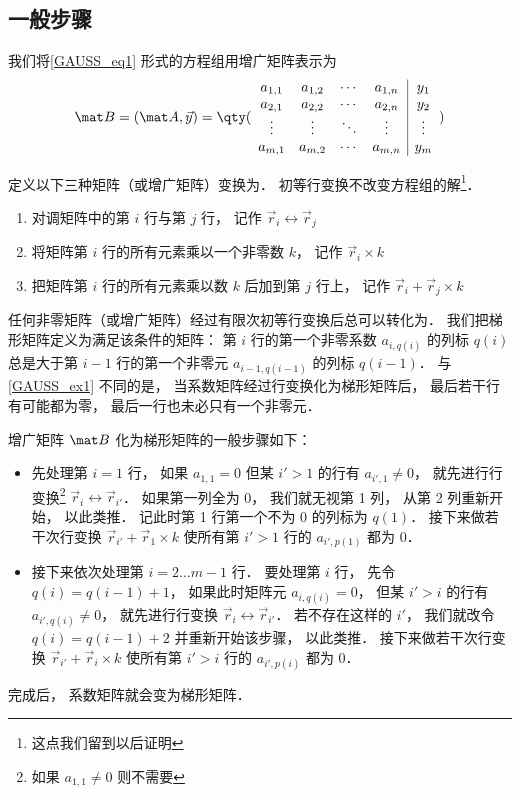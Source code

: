 \subsection{一般步骤}

我们将\autoref{GAUSS_eq1} 形式的方程组用增广矩阵表示为
\begin{equation}
\mat B=(\mat A ,\vec y)={
	\qty( \begin{array}{cccc|c}
	a_{1,1} &a_{1,2} &\cdots &a_{1,n} &y_1 \\
	a_{2,1} &a_{2,2} &\cdots &a_{2,n} &y_2 \\
	\vdots  &\vdots  &\ddots &\vdots  &\vdots \\
	a_{m,1} &a_{m,2} &\cdots &a_{m,n} &y_m \\
	\end{array} 
	)}
\end{equation}

定义以下三种矩阵（或增广矩阵）变换为． 初等行变换不改变方程组的解\footnote{这点我们留到以后证明}．%
\begin{enumerate}
\item 对调矩阵中的第 $i$ 行与第 $j$ 行， 记作 $\vec r_i \leftrightarrow \vec r_j$

\item 将矩阵第 $i$ 行的所有元素乘以一个非零数 $k$， 记作 $\vec r_i \times k$

\item 把矩阵第 $i$ 行的所有元素乘以数 $k$ 后加到第 $j$ 行上， 记作 $\vec r_i + \vec r_j \times k$
\end{enumerate}

任何非零矩阵（或增广矩阵）经过有限次初等行变换后总可以转化为． 我们把梯形矩阵定义为满足该条件的矩阵： 第 $i$ 行的第一个非零系数 $a_{i,q(i)}$ 的列标 $q(i)$ 总是大于第 $i-1$ 行的第一个非零元 $a_{i-1, q(i-1)}$ 的列标 $q(i-1)$． 与\autoref{GAUSS_ex1} 不同的是， 当系数矩阵经过行变换化为梯形矩阵后， 最后若干行有可能都为零， 最后一行也未必只有一个非零元．

增广矩阵 $\mat B$ 化为梯形矩阵的一般步骤如下：
\begin{itemize}
\item 先处理第 $i = 1$ 行， 如果 $a_{1,1} = 0$ 但某 $i' > 1$ 的行有 $a_{i', 1} \ne 0$， 就先进行行变换\footnote{如果 $a_{1,1} \ne 0$ 则不需要} $\vec r_i \leftrightarrow \vec r_{i'}$． 如果第一列全为 0， 我们就无视第  1 列， 从第 2 列重新开始， 以此类推． 记此时第 1 行第一个不为 0 的列标为 $q(1)$． 接下来做若干次行变换 $\vec r_{i'} + \vec r_1 \times k$ 使所有第 $i' > 1$ 行的 $a_{i', p(1)}$ 都为 0．

\item 接下来依次处理第 $i = 2\dots m-1$ 行． 要处理第 $i$ 行， 先令 $q(i) = q(i-1)+1$， 如果此时矩阵元 $a_{i, q(i)} = 0$， 但某 $i' > i$ 的行有 $a_{i', q(i)} \ne 0$， 就先进行行变换 $\vec r_i \leftrightarrow \vec r_{i'}$． 若不存在这样的 $i'$， 我们就改令 $q(i) = q(i-1) + 2$ 并重新开始该步骤， 以此类推． 接下来做若干次行变换 $\vec r_{i'} + \vec r_i \times k$ 使所有第 $i' > i$ 行的 $a_{i', p(i)}$ 都为 0．
\end{itemize}
完成后， 系数矩阵就会变为梯形矩阵．

